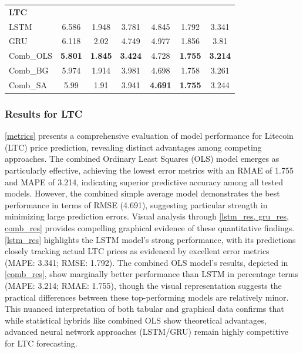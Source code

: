 \documentclass{dsfe}
\begin{document}
\begin{table}[t]
\begin{tabular}{lccc|ccc}
\multicolumn{7}{l}{\textbf{LTC}}\\
\hspace{1em}LSTM & 6.586 & 1.948 & 3.781 & 4.845 & 1.792 & 3.341\\
\hspace{1em}GRU & 6.118 & 2.02 & 4.749 & 4.977 & 1.856 & 3.81\\
\hspace{1em}Comb\_OLS &\textbf{ 5.801} & \textbf{1.845} & \textbf{3.424} & 4.728 & \textbf{1.755} & \textbf{3.214}\\
\hspace{1em}Comb\_BG & 5.974 & 1.914 & 3.981 & 4.698 & 1.758 & 3.261\\
\hspace{1em}Comb\_SA & 5.99 & 1.91 & 3.941 & \textbf{4.691} & \textbf{1.755} & 3.244\\ \hline
\end{tabular}
\end{table}
\subsubsection{Results for LTC}
\autoref{metrics} presents a comprehensive evaluation of model performance for Litecoin (LTC) price prediction, revealing distinct advantages among competing approaches. The combined Ordinary Least Squares (OLS) model emerges as particularly effective, achieving the lowest error metrics with an RMAE of 1.755 and MAPE of 3.214, indicating superior predictive accuracy among all tested models. However, the combined simple average model demonstrates the best performance in terms of RMSE (4.691), suggesting particular strength in minimizing large prediction errors. Visual analysis through \autoref{lstm_res, gru_res, comb_res} provides compelling graphical evidence of these quantitative findings. \autoref{lstm_res} highlights the LSTM model's strong performance, with its predictions closely tracking actual LTC prices as evidenced by excellent error metrics (MAPE: 3.341; RMSE: 1.792). The combined OLS model's results, depicted in \autoref{comb_res}, show marginally better performance than LSTM in percentage terms (MAPE: 3.214; RMAE: 1.755), though the visual representation suggests the practical differences between these top-performing models are relatively minor. This nuanced interpretation of both tabular and graphical data confirms that while statistical hybrids like combined OLS show theoretical advantages, advanced neural network approaches (LSTM/GRU) remain highly competitive for LTC forecasting.
\end{document}
